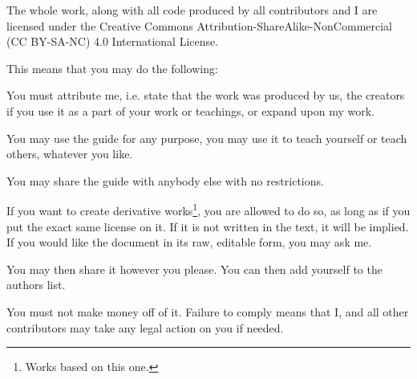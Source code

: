 \documentclass[../main.tex]{subfiles}
\begin{document}
The whole work, along with all code produced by all contributors and I are licensed
under the Creative Commons Attribution-ShareAlike-NonCommercial (CC BY-SA-NC) 4.0 International License.

This means that you may do the following:

\enumerate
\item You must attribute me, i.e. state that the work was produced by us, the creators if
you use it as a part of your work or teachings, or expand upon my work.

\item You may use the guide for any purpose, you may use it to teach yourself or teach
others, whatever you like.

\item You may share the guide with anybody else with no restrictions.

\item If you want to create derivative works\footnote{Works based on this one.}, you are allowed to do so, as long as if
you put the exact same license on it. If it is not written in the text, it will be
implied. If you would like the document in its raw, editable form, you may ask
me.

\item You may then share it however you please. You can then add yourself to
the authors list.

\item You must not make money off of it. Failure to comply means that I, and all
other contributors may take any legal action on you if needed.

\endenumerate
\end{document}
